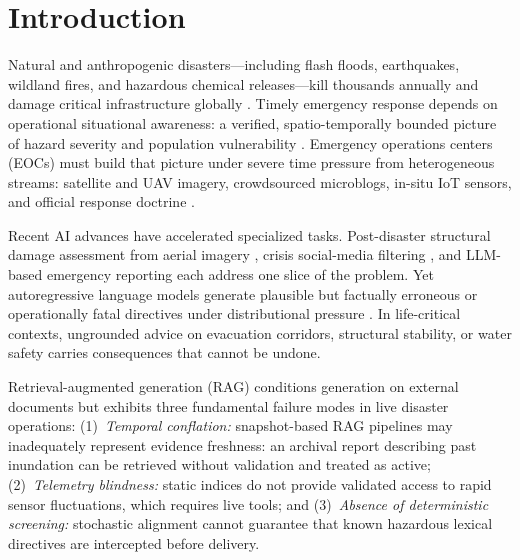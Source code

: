 \documentclass[conference]{IEEEtran}
\begin{document}
\section{Introduction}
Natural and anthropogenic disasters---including flash floods, earthquakes, wildland fires, and hazardous chemical releases---kill thousands annually and damage critical infrastructure globally \cite{undrr}. Timely emergency response depends on operational situational awareness: a verified, spatio-temporally bounded picture of hazard severity and population vulnerability \cite{endsley,aboualola2023}. Emergency operations centers (EOCs) must build that picture under severe time pressure from heterogeneous streams: satellite and UAV imagery, crowdsourced microblogs, in-situ IoT sensors, and official response doctrine \cite{crisismmd,aboualola2023}.

Recent AI advances have accelerated specialized tasks. Post-disaster structural damage assessment from aerial imagery \cite{singh}, crisis social-media filtering \cite{olteanu2015,dinani}, and LLM-based emergency reporting \cite{cantini} each address one slice of the problem. Yet autoregressive language models generate plausible but factually erroneous or operationally fatal directives under distributional pressure \cite{ji,yu2024}. In life-critical contexts, ungrounded advice on evacuation corridors, structural stability, or water safety carries consequences that cannot be undone.

Retrieval-augmented generation (RAG) \cite{lewis} conditions generation on external documents but exhibits three fundamental failure modes in live disaster operations:
(1)~\textit{Temporal conflation:} snapshot-based RAG pipelines may inadequately represent evidence freshness: an archival report describing past inundation can be retrieved without validation and treated as active; (2)~\textit{Telemetry blindness:} static indices do not provide validated access to rapid sensor fluctuations, which requires live tools; and (3)~\textit{Absence of deterministic screening:} stochastic alignment cannot guarantee that known hazardous lexical directives are intercepted before delivery.
\end{document}
